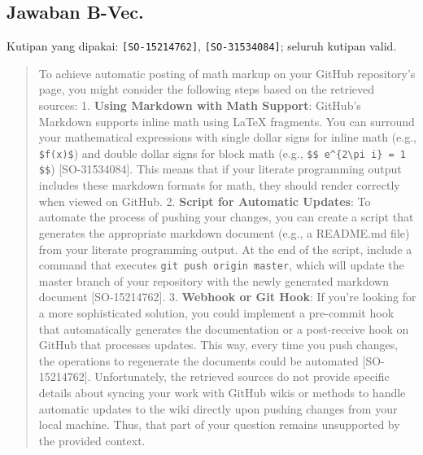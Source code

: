 \subsection{Jawaban B-Vec.} Kutipan yang dipakai: \texttt{[SO-15214762]}, \texttt{[SO-31534084]}; seluruh kutipan valid.
\begin{quote}\small To achieve automatic posting of math markup on your GitHub repository's page, you might consider the following steps based on the retrieved sources:  1. \textbf{Using Markdown with Math Support}: GitHub's Markdown supports inline math using LaTeX fragments. You can surround your mathematical expressions with single dollar signs for inline math (e.g., \texttt{\$f(x)\allowbreak{}\$}) and double dollar signs for block math (e.g., \texttt{\$\$ e\^{}\{2\textbackslash{}pi i\} =\allowbreak{} 1 \$\$}) [SO-31534084]. This means that if your literate programming output includes these markdown formats for math, they should render correctly when viewed on GitHub.  2. \textbf{Script for Automatic Updates}: To automate the process of pushing your changes, you can create a script that generates the appropriate markdown document (e.g., a README.md file) from your literate programming output. At the end of the script, include a command that executes \texttt{git push origin master}, which will update the master branch of your repository with the newly generated markdown document [SO-15214762].   3. \textbf{Webhook or Git Hook}: If you're looking for a more sophisticated solution, you could implement a pre-commit hook that automatically generates the documentation or a post-receive hook on GitHub that processes updates. This way, every time you push changes, the operations to regenerate the documents could be automated [SO-15214762].   Unfortunately, the retrieved sources do not provide specific details about syncing your work with GitHub wikis or methods to handle automatic updates to the wiki directly upon pushing changes from your local machine. Thus, that part of your question remains unsupported by the provided context.\end{quote}
